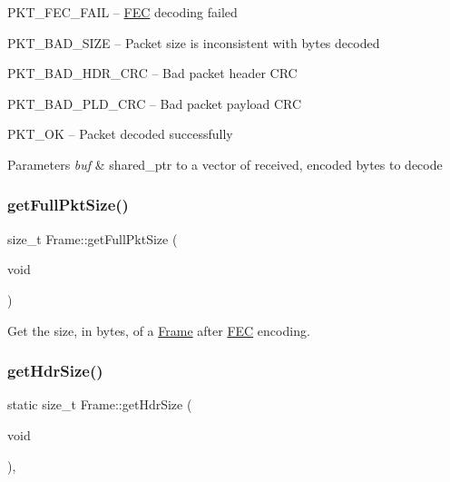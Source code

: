 \begin{DoxyItemize}
\item P\+K\+T\+\_\+\+F\+E\+C\+\_\+\+F\+A\+IL -- \hyperlink{classFEC}{F\+EC} decoding failed ~\newline

\item P\+K\+T\+\_\+\+B\+A\+D\+\_\+\+S\+I\+ZE -- Packet size is inconsistent with bytes decoded ~\newline

\item P\+K\+T\+\_\+\+B\+A\+D\+\_\+\+H\+D\+R\+\_\+\+C\+RC -- Bad packet header C\+RC ~\newline

\item P\+K\+T\+\_\+\+B\+A\+D\+\_\+\+P\+L\+D\+\_\+\+C\+RC -- Bad packet payload C\+RC ~\newline

\item P\+K\+T\+\_\+\+OK -- Packet decoded successfully ~\newline
 
\begin{DoxyParams}{Parameters}
{\em buf} & shared\+\_\+ptr to a vector of received, encoded bytes to decode \\
\hline
\end{DoxyParams}

\end{DoxyItemize}\mbox{\label{classFrame_abdb6ae194b6afb15b37d770f12ad9343}} 
\subsubsection{\texorpdfstring{get\+Full\+Pkt\+Size()}{getFullPktSize()}}
{\footnotesize\ttfamily size\+\_\+t Frame\+::get\+Full\+Pkt\+Size (\begin{DoxyParamCaption}\item[{void}]{ }\end{DoxyParamCaption})}

Get the size, in bytes, of a \hyperlink{classFrame}{Frame} after \hyperlink{classFEC}{F\+EC} encoding. \mbox{\label{classFrame_a26923d6e02a809d968809d33b0ee9175}} 
\subsubsection{\texorpdfstring{get\+Hdr\+Size()}{getHdrSize()}}
{\footnotesize\ttfamily static size\+\_\+t Frame\+::get\+Hdr\+Size (\begin{DoxyParamCaption}\item[{void}]{ }\end{DoxyParamCaption})\hspace{0.3cm}{\ttfamily [inline]}, {\ttfamily [static]}}

